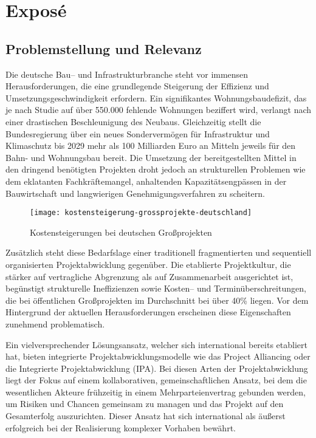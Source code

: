 \cleardoublepage
\chapter*{Exposé}
\section*{Problemstellung und Relevanz}
\label{sec:problemstellung}
Die deutsche Bau-- und Infrastrukturbranche steht vor immensen Herausforderungen, die  eine grundlegende Steigerung der Effizienz und Umsetzungsgeschwindigkeit erfordern.  Ein signifikantes Wohnungsbaudefizit, das je nach Studie auf über 550.000 fehlende  Wohnungen beziffert wird, verlangt nach einer drastischen Beschleunigung des Neubaus\autocite[]{}. Gleichzeitig stellt die  Bundesregierung über ein neues Sondervermögen für Infrastruktur und Klimaschutz bis  2029 mehr als 100 Milliarden Euro an Mitteln jeweils für den Bahn- und Wohnungsbau  bereit\autocite[]{brinkmeier2025}. Die Umsetzung der bereitgestellten Mittel in den dringend  benötigten Projekten droht jedoch an strukturellen Problemen wie dem eklatanten  Fachkräftemangel, anhaltenden Kapazitätsengpässen in der Bauwirtschaft und  langwierigen Genehmigungsverfahren zu scheitern\autocite[]{hdb2025}.

\begin{figure}[htbp]
    \centering
    \texttt{[image: kostensteigerung-grossprojekte-deutschland]}
    \caption{Kostensteigerungen bei deutschen Großprojekten \cite{statista2024grossprojekte}}
    \label{fig:kostensteigerung-grossprojekte}
\end{figure}
\clearpage
Zusätzlich steht diese Bedarfslage einer traditionell fragmentierten und sequentiell  organisierten Projektabwicklung gegenüber. Die etablierte Projektkultur, die stärker auf  vertragliche Abgrenzung als auf Zusammenarbeit ausgerichtet ist, begünstigt strukturelle  Ineffizienzen sowie Kosten-- und Terminüberschreitungen, die bei öffentlichen  Großprojekten im Durchschnitt bei über 40\% liegen\autocite[]{korn2019}. Vor dem  Hintergrund der aktuellen Herausforderungen erscheinen diese Eigenschaften  zunehmend problematisch.

Ein vielversprechender Lösungsansatz, welcher sich international bereits etabliert hat,  bieten integrierte Projektabwicklungsmodelle wie das Project Alliancing oder die  Integrierte Projektabwicklung (IPA). Bei diesen Arten der Projektabwicklung liegt der  Fokus auf einem kollaborativen, gemeinschaftlichen Ansatz, bei dem die wesentlichen  Akteure frühzeitig in einem Mehrparteienvertrag gebunden werden, um Risiken und  Chancen gemeinsam zu managen und das Projekt auf den Gesamterfolg auszurichten.  Dieser Ansatz hat sich international als äußerst erfolgreich bei der Realisierung  komplexer Vorhaben bewährt\autocite[]{cook2014}.

